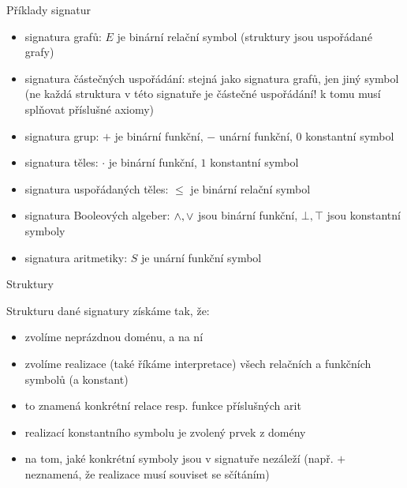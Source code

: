 \documentclass{beamer}
\begin{document}
\begin{frame}{Příklady signatur}

    \begin{itemize}
        \item {} signatura \alert{grafů}: $E$ je binární relační symbol (struktury jsou uspořádané grafy)
        \item \myexampleinline{
        $\langle \leq \rangle$
        } signatura \alert{částečných uspořádání}: stejná jako signatura grafů, jen jiný symbol (ne každá struktura v této signatuře je částečné uspořádání! k tomu musí splňovat příslušné \alert{axiomy})
        \item \myexampleinline{
        $\langle +, -, 0\rangle$
        } signatura \alert{grup}: $+$ je binární funkční, $-$ unární funkční, $0$ konstantní symbol
        \item {} signatura \alert{těles}: $\cdot$ je binární funkční, $1$ konstantní symbol
        \item {} signatura \alert{uspořádaných těles}: $\leq$ je binární relační symbol
        \item \myexampleinline{
        $\langle -,\landsymb,\lorsymb,\bot,\top\rangle$
        } signatura \alert{Booleových algeber}: ${\land},{\lor}$ jsou binární funkční, $\bot,\top$ jsou konstantní symboly
        \item {} signatura \alert{aritmetiky}: $S$ je unární funkční symbol
    \end{itemize}
    
\end{frame}


\begin{frame}{Struktury}

    \alert{Strukturu} dané signatury získáme tak, že:
    \begin{itemize}
        \item zvolíme neprázdnou \alert{doménu}, a na ní
        \item zvolíme \alert{realizace} (také říkáme \alert{interpretace}) všech relačních a funkčních symbolů (a konstant)
        \item to znamená \alert{konkrétní} relace resp. funkce příslušných arit
        \item realizací konstantního symbolu je zvolený prvek z domény
        \item na tom, jaké konkrétní symboly jsou v signatuře nezáleží (např. $+$ neznamená, že realizace musí souviset se sčítáním)
    \end{itemize}

\end{frame}
\end{document}
